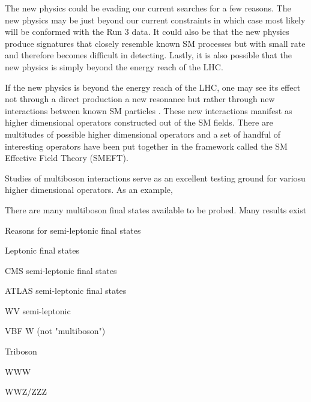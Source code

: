 \documentclass[10pt]{article}
\begin{document}
The new physics could be evading our current searches for a few reasons.
The new physics may be just beyond our current constraints in which case most likely will be conformed with the Run 3 data.
It could also be that the new physics produce signatures that closely resemble known SM processes but with small rate and therefore becomes difficult in detecting.
Lastly, it is also possible that the new physics is simply beyond the energy reach of the LHC.

If the new physics is beyond the energy reach of the LHC, one may see its effect not through a direct production a new resonance but rather through new interactions between known SM particles \cite{}.
These new interactions manifest as higher dimensional operators constructed out of the SM fields.
There are multitudes of possible higher dimensional operators and a set of handful of interesting operators have been put together in the framework called the SM Effective Field Theory (SMEFT)\cite{}.

Studies of multiboson interactions serve as an excellent testing ground for variosu higher dimensional operators.
As an example, 

There are many multiboson final states available to be probed.
Many results exist

Reasons for semi-leptonic final states

Leptonic final states

CMS semi-leptonic final states

ATLAS semi-leptonic final states

WV semi-leptonic

VBF W (not "multiboson")

Triboson

WWW

WWZ/ZZZ














\end{document}
